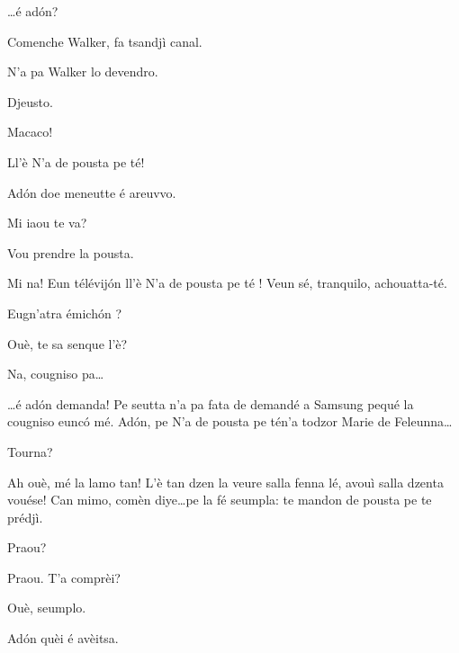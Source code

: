 \begin{drama}
\Vioujspeaks \ldots é ad\'on?

\Vioupspeaks Comenche Walker, fa tsandjì canal.

\Vioujspeaks N'a pa Walker lo devendro.

\Vioupspeaks Djeusto.

\Vioujspeaks Macaco!

\Vioupspeaks Ll'è \og N'a de pousta pe té\fg!


\Vioujspeaks Ad\'on doe meneutte é areuvvo.

\Vioupspeaks Mi iaou te va?

\Vioujspeaks Vou prendre la pousta.

\Vioupspeaks Mi na! Eun télévij\'on ll'è \og N'a de pousta pe té \fg ! Veun sé, tranquilo, achouatta-té.


\Vioujspeaks Eugn'atra émich\'on ?

\Vioupspeaks Ouè, te sa senque l'è?

\Vioujspeaks Na, cougniso pa\ldots

\Vioupspeaks \ldots é ad\'on demanda! Pe seutta n'a pa fata de demandé a Samsung pequé la cougniso eunc\'o mé. Ad\'on, pe \og N'a de pousta pe té\fg n'a todzor Marie de Feleunna\ldots

\Vioujspeaks Tourna?

\Vioupspeaks Ah ouè, mé la lamo tan! L'è tan dzen la veure salla fenna lé, avouì salla dzenta vouése! Can mimo, comèn diye\ldots pe la fé seumpla: te mandon de pousta pe te prédjì.

\Vioujspeaks Praou?

\Vioupspeaks Praou. T'a comprèi?

\Vioujspeaks Ouè, seumplo.

\Vioupspeaks Ad\'on quèi é avèitsa.



\scene[-- N'a de pousta pe té]

\label{pousta}
 


\end{drama}
